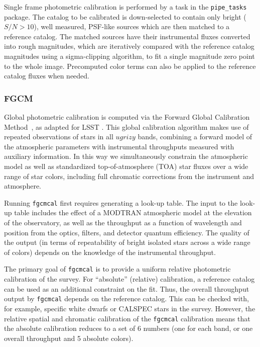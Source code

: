 Single frame photometric calibration is performed by a task in the \texttt{pipe\_tasks} package.
The catalog to be calibrated is down-selected to contain only bright ($S/N>10$), well measured, PSF-like sources which are then matched to a reference catalog.
The matched sources have their instrumental fluxes converted into rough magnitudes, which are iteratively compared with the reference catalog magnitudes using a sigma-clipping algorithm, to fit a single magnitude zero point to the whole image.
Precomputed color terms can also be applied to the reference catalog fluxes when needed.

\subsubsection{FGCM}
\label{sec:fgcmcal}

Global photometric calibration is computed via the Forward Global Calibration Method~\citep[FGCM][]{2018AJ....155...41B}, as adapted for LSST \citep{SITCOMTN-086}.
This global calibration algorithm makes use of repeated observations of stars in all $ugrizy$ bands, combining a forward model of the atmospheric parameters with instrumental throughputs measured with auxiliary information.
In this way we simultaneously constrain the atmospheric model as well as standardized top-of-atmosphere (TOA) star fluxes over a wide range of star colors, including full chromatic corrections from the instrument and atmosphere.

Running \texttt{fgcmcal} first requires generating a look-up table.
The input to the look-up table includes the effect of a MODTRAN \citep{1999SPIE.3756..348B} atmospheric model at the elevation of the observatory, as well as the throughput as a function of wavelength and position from the optics, filters, and detector quantum efficiency.
The quality of the output (in terms of repeatability of bright isolated stars across a wide range of colors) depends on the knowledge of the instrumental throughput.

The primary goal of \texttt{fgcmcal} is to provide a uniform relative photometric calibration of the survey.
For ``absolute'' (relative) calibration, a reference catalog can be used as an additional constraint on the fit.
Thus, the overall throughput output by \texttt{fgcmcal} depends on the reference catalog.
This can be checked with, for example, specific white dwarfs or CALSPEC \citep{2007ASPC..364..315B} stars in the survey.
However, the relative spatial and chromatic calibration of the \texttt{fgcmcal} calibration means that the absolute calibration reduces to a set of 6 numbers (one for each band, or one overall throughput and 5 absolute colors).

